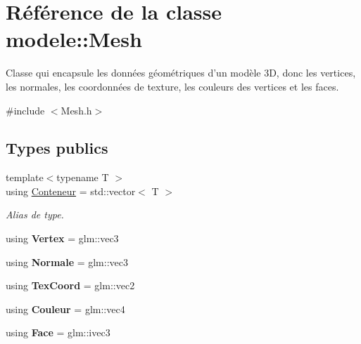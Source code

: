 \hypertarget{classmodele_1_1_mesh}{\section{Référence de la classe modele\-:\-:Mesh}
\label{classmodele_1_1_mesh}
}


Classe qui encapsule les données géométriques d'un modèle 3\-D, donc les vertices, les normales, les coordonnées de texture, les couleurs des vertices et les faces.  




{\ttfamily \#include $<$Mesh.\-h$>$}

\subsection*{Types publics}
\begin{DoxyCompactItemize}
\item 
\hypertarget{classmodele_1_1_mesh_adbc8897d8cdca4541a2068c874aa54eb}{{\footnotesize template$<$typename T $>$ }\\using \hyperlink{classmodele_1_1_mesh_adbc8897d8cdca4541a2068c874aa54eb}{Conteneur} = std\-::vector$<$ T $>$}\label{classmodele_1_1_mesh_adbc8897d8cdca4541a2068c874aa54eb}

\begin{DoxyCompactList}\small\item\em Alias de type. \end{DoxyCompactList}\item 
\hypertarget{classmodele_1_1_mesh_afff0dcaf39cb8aac23e07704fd404b92}{using {\bfseries Vertex} = glm\-::vec3}\label{classmodele_1_1_mesh_afff0dcaf39cb8aac23e07704fd404b92}

\item 
\hypertarget{classmodele_1_1_mesh_a3d99d2b7a917cf9366fcda290afed7e8}{using {\bfseries Normale} = glm\-::vec3}\label{classmodele_1_1_mesh_a3d99d2b7a917cf9366fcda290afed7e8}

\item 
\hypertarget{classmodele_1_1_mesh_a92ca30b14afcb78679c812e44cdf176d}{using {\bfseries Tex\-Coord} = glm\-::vec2}\label{classmodele_1_1_mesh_a92ca30b14afcb78679c812e44cdf176d}

\item 
\hypertarget{classmodele_1_1_mesh_a41e1ae261228cf93233b09232d6be11d}{using {\bfseries Couleur} = glm\-::vec4}\label{classmodele_1_1_mesh_a41e1ae261228cf93233b09232d6be11d}

\item 
\hypertarget{classmodele_1_1_mesh_a6977203afc00e8f371f49c91f7fab183}{using {\bfseries Face} = glm\-::ivec3}\label{classmodele_1_1_mesh_a6977203afc00e8f371f49c91f7fab183}

\end{DoxyCompactItemize}
